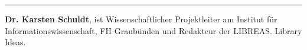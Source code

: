 \begin{center}\rule{0.5\linewidth}{0.5pt}\end{center}

\textbf{Dr. Karsten Schuldt}, ist Wissenschaftlicher Projektleiter am
Institut für Informationswissenschaft, FH Graubünden und Redakteur der
LIBREAS. Library Ideas.
